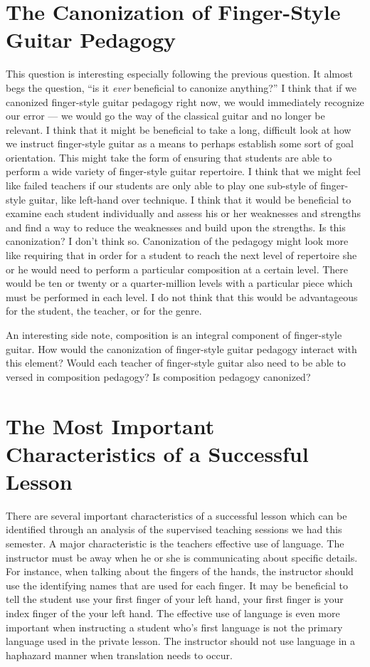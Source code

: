 \documentclass[12pt]{article}
\begin{document}
\section{The Canonization of Finger-Style Guitar Pedagogy}
\label{sec:canon-fing-style}

This question is interesting especially following the previous
question. It almost begs the question, ``is it \emph{ever} beneficial
to canonize anything?'' I think that if we canonized finger-style
guitar pedagogy right now, we would immediately recognize our error
--- we would go the way of the classical guitar and no longer be
relevant. I think that it might be beneficial to take a long,
difficult look at how we instruct finger-style guitar as a means to
perhaps establish some sort of goal orientation. This might take the
form of ensuring that students are able to perform a wide variety of
finger-style guitar repertoire. I think that we might feel like failed
teachers if our students are only able to play one sub-style of
finger-style guitar, like left-hand over technique. I think that it
would be beneficial to examine each student individually and assess
his or her weaknesses and strengths and find a way to reduce the
weaknesses and build upon the strengths. Is this canonization? I don't
think so. Canonization of the pedagogy might look more like requiring
that in order for a student to reach the next level of repertoire she
or he would need to perform a particular composition at a certain
level. There would be ten or twenty or a quarter-million levels with a
particular piece which must be performed in each level. I do not think
that this would be advantageous for the student, the teacher, or for
the genre.

An interesting side note, composition is an integral component of
finger-style guitar. How would the canonization of finger-style guitar
pedagogy interact with this element? Would each teacher of
finger-style guitar also need to be able to versed in composition
pedagogy? Is composition pedagogy canonized?

\section{The Most Important Characteristics of a Successful Lesson}
\label{sec:most-import-char}

There are several important characteristics of a successful lesson
which can be identified through an analysis of the supervised teaching
sessions we had this semester. A major characteristic is the teachers
effective use of language. The instructor must be away when he or she
is communicating about specific details. For instance, when talking
about the fingers of the hands, the instructor should use the
identifying names that are used for each finger. It may be beneficial
to tell the student use your first finger of your left hand, your
first finger is your index finger of the your left hand. The effective
use of language is even more important when instructing a student
who's first language is not the primary language used in the private
lesson. The instructor should not use language in a haphazard manner
when translation needs to occur.
\end{document}
